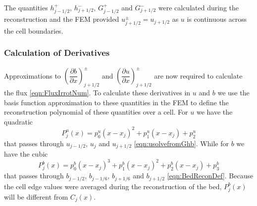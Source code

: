 The quantities $h^+_{j - 1/2}$, $h^-_{j + 1/2}$, $G^+_{j - 1/2}$ and $G^-_{j + 1/2}$ were calculated during the reconstruction and the FEM provided $u^\pm_{j+1/2} = u_{j+1/2}$ as $u$ is continuous across the cell boundaries.

\subsubsection{Calculation of Derivatives}
Approximations to $\left(\dfrac{\partial {b}}{\partial x} \right)^\pm_{j + 1/2}$ and $\left(\dfrac{\partial {u}}{\partial x} \right)^\pm_{j + 1/2}$ are now required to calculate the flux \eqref{eqn:FluxIrrotNum}. To calculate these derivatives in $u$ and $b$ we use the basis function approximation to these quantities in the FEM to define the reconstruction polynomial of these quantities over a cell. For $u$ we have the quadratic
	\begin{equation}
	P^u_j(x) = p^u_0 \left(x - x_j\right)^2 + p^u_1 \left(x - x_j\right) + p^u_2
	\label{eqn:Polyforucell}
	\end{equation}
that passes through $u_{j-1/2}$, $u_j$ and $u_{j+1/2}$ \eqref{eqn:usolvefromGhb}. While for $b$ we have the cubic
	\begin{equation}
	P^b_j(x) = p^b_0 \left(x - x_j\right)^3 + p^b_1 \left(x - x_j\right)^2 + p^b_2 \left(x - x_j\right)  + p^b_3
	\label{eqn:Polyforbcell}
	\end{equation}
that passes through $b_{j-1/2}$, $b_{j-1/6}$, $b_{j+1/6}$ and $b_{j+1/2}$ \eqref{eqn:BedReconDef}. Because the cell edge values were averaged during the reconstruction of the bed, $P^b_j(x)$ will be different from $C_j(x)$.


